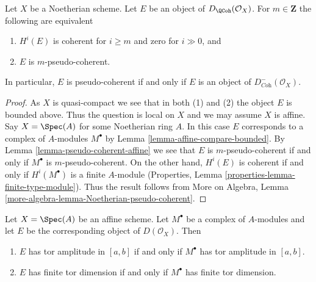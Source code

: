 \begin{lemma}
\label{lemma-identify-pseudo-coherent-noetherian}
Let $X$ be a Noetherian scheme. Let $E$ be an object of
$D_\QCoh(\mathcal{O}_X)$. For $m \in \mathbf{Z}$ the
following are equivalent
\begin{enumerate}
\item $H^i(E)$ is coherent for $i \geq m$ and zero for $i \gg 0$, and
\item $E$ is $m$-pseudo-coherent.
\end{enumerate}
In particular, $E$ is pseudo-coherent if and only if $E$ is an object
of $D^-_{\textit{Coh}}(\mathcal{O}_X)$.
\end{lemma}

\begin{proof}
As $X$ is quasi-compact we see that in both (1) and (2) the object $E$
is bounded above. Thus the question is local on $X$ and we may assume
$X$ is affine. Say $X = \Spec(A)$ for some Noetherian ring $A$.
In this case $E$ corresponds to a complex of $A$-modules $M^\bullet$
by Lemma \ref{lemma-affine-compare-bounded}. By
Lemma \ref{lemma-pseudo-coherent-affine}
we see that $E$ is $m$-pseudo-coherent if and only if $M^\bullet$
is $m$-pseudo-coherent. On the other hand, $H^i(E)$ is coherent
if and only if $H^i(M^\bullet)$ is a finite $A$-module
(Properties, Lemma \ref{properties-lemma-finite-type-module}).
Thus the result follows from More on Algebra, Lemma
\ref{more-algebra-lemma-Noetherian-pseudo-coherent}.
\end{proof}

\begin{lemma}
\label{lemma-tor-dimension-affine}
Let $X = \Spec(A)$ be an affine scheme. Let $M^\bullet$ be a
complex of $A$-modules and let $E$ be the corresponding object
of $D(\mathcal{O}_X)$. Then
\begin{enumerate}
\item $E$ has tor amplitude in $[a, b]$ if and only if $M^\bullet$
has tor amplitude in $[a, b]$.
\item $E$ has finite tor dimension if and only if $M^\bullet$
has finite tor dimension.
\end{enumerate}
\end{lemma}

